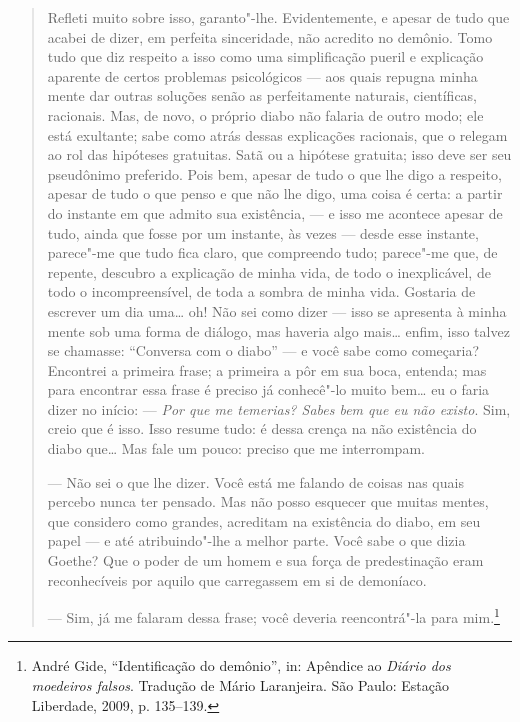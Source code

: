 \begin{quote}
Refleti muito sobre isso, garanto"-lhe. Evidentemente, e apesar de tudo
que acabei de dizer, em perfeita sinceridade, não acredito no demônio.
Tomo tudo que diz respeito a isso como uma simplificação pueril e
explicação aparente de certos problemas psicológicos --- aos quais
repugna minha mente dar outras soluções senão as perfeitamente naturais,
científicas, racionais. Mas, de novo, o próprio diabo não falaria de
outro modo; ele está exultante; sabe como atrás dessas explicações
racionais, que o relegam ao rol das hipóteses gratuitas. Satã ou a
hipótese gratuita; isso deve ser seu pseudônimo preferido. Pois bem,
apesar de tudo o que lhe digo a respeito, apesar de tudo o que penso e
que não lhe digo, uma coisa é certa: a partir do instante em que admito
sua existência, --- e isso me acontece apesar de tudo, ainda que fosse por
um instante, às vezes --- desde esse instante, parece"-me que tudo fica
claro, que compreendo tudo; parece"-me que, de repente, descubro a
explicação de minha vida, de todo o inexplicável, de todo o
incompreensível, de toda a sombra de minha vida. Gostaria de escrever um
dia uma\ldots{} oh! Não sei como dizer --- isso se apresenta à minha mente
sob uma forma de diálogo, mas haveria algo mais\ldots{} enfim, isso talvez
se chamasse: ``Conversa com o diabo'' --- e você sabe como começaria?
Encontrei a primeira frase; a primeira a pôr em sua boca, entenda; mas
para encontrar essa frase é preciso já conhecê"-lo muito bem\ldots{} eu o
faria dizer no início: --- \emph{Por que me temerias? Sabes bem que eu não
existo}. Sim, creio que é isso. Isso resume tudo: é dessa crença na não
existência do diabo que\ldots{} Mas fale um pouco: preciso que me
interrompam.

--- Não sei o que lhe dizer. Você está me falando de coisas nas quais
percebo nunca ter pensado. Mas não posso esquecer que muitas mentes, que
considero como grandes, acreditam na existência do diabo, em seu papel
--- e até atribuindo"-lhe a melhor parte. Você sabe o que dizia Goethe?
Que o poder de um homem e sua força de predestinação eram reconhecíveis
por aquilo que carregassem em si de demoníaco.

--- Sim, já me falaram dessa frase; você deveria reencontrá"-la para
mim.\footnote{André Gide, ``Identificação do demônio'', in:
  Apêndice ao \emph{Diário dos moedeiros falsos}. Tradução de Mário
  Laranjeira. São Paulo: Estação Liberdade, 2009, p. 135--139. \versal{[N.~T.]}}
\end{quote}

